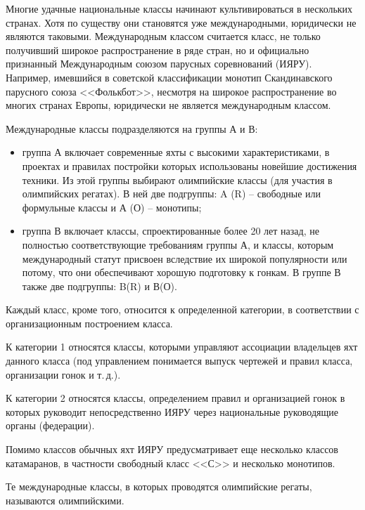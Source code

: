 \documentclass[a4paper, 12pt, twoside, final]{scrbook}
\begin{document}
Многие удачные национальные классы начинают культивироваться в нескольких
странах. Хотя по существу они становятся уже международными, юридически
не являются таковыми. Международным классом считается класс, не только
получивший широкое распространение в ряде стран, но и официально признанный
Международным союзом парусных соревнований (ИЯРУ). Например, имевшийся
в советской классификации монотип Скандинавского парусного союза <<Фолькбот>>,
несмотря на широкое распространение во многих странах Европы, юридически
не является международным классом.

Международные классы подразделяются на группы А и В:
\begin{itemize}
\item группа А включает современные яхты с высокими характеристиками, в
проектах и правилах постройки которых использованы новейшие достижения
техники. Из этой группы выбирают олимпийские классы (для участия в
олимпийских регатах). В ней две подгруппы: A (R) \--- свободные или формульные
классы и А (О) \--- монотипы;
\item группа В включает классы, спроектированные более 20 лет назад, не
полностью соответствующие требованиям группы А, и классы, которым
международный статут присвоен вследствие их широкой популярности или
потому, что они обеспечивают хорошую подготовку к гонкам. В группе
В также две подгруппы: B(R) и В(О).
\end{itemize}
Каждый класс, кроме того, относится к определенной категории, в соответствии
с организационным построением класса.

К категории 1 относятся классы, которыми управляют ассоциации владельцев
яхт данного класса (под управлением понимается выпуск чертежей и правил
класса, организации гонок и т.\,д.).

К категории 2 относятся классы, определением правил и организацией
гонок в которых руководит непосредственно ИЯРУ через национальные
руководящие органы (федерации).

Помимо классов обычных яхт ИЯРУ предусматривает еще несколько классов
катамаранов, в частности свободный класс <<С>> и несколько монотипов.

Те международные классы, в которых проводятся олимпийские регаты,
называются олимпийскими.
\end{document}
